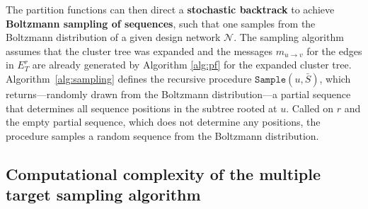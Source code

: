 \documentclass{bioinfo}
\newcommand{\network}{\mathcal{N}}
\newcommand{\val}{\bar S} %
\newcommand{\partfun}[1]{\mathcal{Z}_{#1}}
\newcommand{\Message}[2]{m_{#1\rightarrow #2}}
\newcommand{\F}{\mathcal{F}}
\newcommand{\sample}{\texttt{Sample}}
\newcommand{\edgesToR}{E^r_T}
\newcommand{\phitotal}{\phi_{\operatorname{m}}}
\newcommand{\Def}[1]{{\bfseries #1}}
\newcommand{\evalfor}[2]{#1\llbracket{}#2\rrbracket{}}
\newcommand{\substitute}[2]{#1\!\oplus\!#2}
\begin{document}
 \SetKwFunction{Sample}{$\sample$}


The partition functions can then direct a \Def{stochastic backtrack} to achieve \Def{Boltzmann sampling of sequences}, such that one samples from the Boltzmann distribution of a given design network $\network$. The sampling algorithm assumes that the cluster tree was expanded and the messages $\Message{u}{v}$ for the edges in $\edgesToR{}$ are already generated by Algorithm \ref{alg:pf} for the expanded cluster tree.
%
Algorithm~\ref{alg:sampling} defines the recursive procedure
$\sample(u,\val)$, which returns---randomly drawn from the
Boltzmann distribution---a partial sequence that determines all
sequence positions in the subtree rooted at $u$.  Called on $r$ and
the empty partial sequence, which does not determine any positions,
the procedure samples a random sequence from the Boltzmann
distribution.



\subsection{Computational complexity of the multiple target sampling algorithm}\label{sec:complexity}

\end{document}
